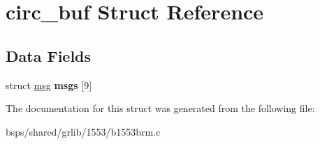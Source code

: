 \hypertarget{structcirc__buf}{}\section{circ\+\_\+buf Struct Reference}
\label{structcirc__buf}
\subsection*{Data Fields}
\begin{DoxyCompactItemize}
\item 
\mbox{\label{structcirc__buf_ad47ce6d25b5f056fdb891d4e95beb70c}} 
struct \mbox{\hyperlink{structmsg}{msg}} {\bfseries msgs} \mbox{[}9\mbox{]}
\end{DoxyCompactItemize}


The documentation for this struct was generated from the following file\+:\begin{DoxyCompactItemize}
\item 
bsps/shared/grlib/1553/b1553brm.\+c\end{DoxyCompactItemize}
